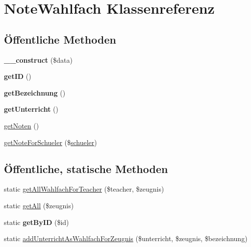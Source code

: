 \hypertarget{class_note_wahlfach}{}\section{Note\+Wahlfach Klassenreferenz}
\label{class_note_wahlfach}
\subsection*{Öffentliche Methoden}
\begin{DoxyCompactItemize}
\item 
\mbox{\label{class_note_wahlfach_aa4804dc46cfcb7a08fa82b7b5505400c}} 
{\bfseries \+\_\+\+\_\+construct} (\$data)
\item 
\mbox{\label{class_note_wahlfach_a305d80be4bf9e108ddde2abab76d0920}} 
{\bfseries get\+ID} ()
\item 
\mbox{\label{class_note_wahlfach_a696891e6cabf149d98db11858c17646b}} 
{\bfseries get\+Bezeichnung} ()
\item 
\mbox{\label{class_note_wahlfach_a58c2e2aa7e64f89ae9c4f191273b20a7}} 
{\bfseries get\+Unterricht} ()
\item 
\mbox{\hyperlink{class_note_wahlfach_ad97c4ed415adf9c581441f9d5b6897a7}{get\+Noten}} ()
\item 
\mbox{\hyperlink{class_note_wahlfach_a4c6534c50c430bef00759c235a60edd2}{get\+Note\+For\+Schueler}} (\$\mbox{\hyperlink{classschueler}{schueler}})
\end{DoxyCompactItemize}
\subsection*{Öffentliche, statische Methoden}
\begin{DoxyCompactItemize}
\item 
static \mbox{\hyperlink{class_note_wahlfach_a57c87929c9a2e1c77510ceff5ae3a7ea}{get\+All\+Wahlfach\+For\+Teacher}} (\$teacher, \$zeugnis)
\item 
static \mbox{\hyperlink{class_note_wahlfach_a1101bb03cefffbd13ce9ea622615b2ea}{get\+All}} (\$zeugnis)
\item 
\mbox{\label{class_note_wahlfach_a36ddb95c40c142fb923281aefce45c30}} 
static {\bfseries get\+By\+ID} (\$id)
\item 
static \mbox{\hyperlink{class_note_wahlfach_a8019a6f967b3eb01e50e1e2709f12773}{add\+Unterricht\+As\+Wahlfach\+For\+Zeugnis}} (\$unterricht, \$zeugnis, \$bezeichnung)
\end{DoxyCompactItemize}


